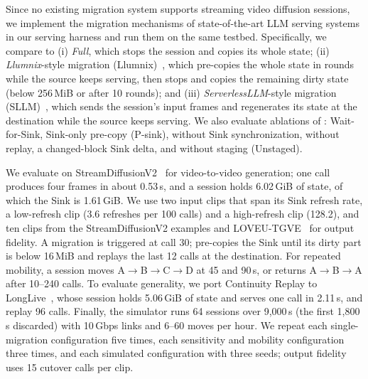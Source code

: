  Since no existing migration system supports streaming video diffusion
sessions, we implement the migration mechanisms of state-of-the-art LLM serving systems in our serving harness and run
them on the same testbed. Specifically, we compare \sys to (i) \emph{Full}, which stops the session and copies its
whole state; (ii) \emph{Llumnix}-style migration (Llumnix)~\cite{llumnix}, which pre-copies the whole state in rounds while the
source keeps serving, then stops and copies the remaining dirty state (below 256\,MiB or after 10 rounds); and
(iii) \emph{ServerlessLLM}-style migration (SLLM)~\cite{serverlessllm}, which sends the session's input frames and
regenerates its state at the destination while the source keeps serving. We also evaluate ablations of \sys:
Wait-for-Sink, Sink-only pre-copy (P-sink), \sys without Sink synchronization, \sys without replay, a changed-block
Sink delta, and \sys without staging (Unstaged).

 We evaluate \sys on StreamDiffusionV2~\cite{sdv2} for video-to-video
generation; one call produces four frames in about 0.53\,s, and a session holds 6.02\,GiB of state, of which the Sink
is 1.61\,GiB. We use two input clips that span its Sink refresh rate, a low-refresh clip (3.6 refreshes per 100 calls)
and a high-refresh clip (128.2), and ten clips from the StreamDiffusionV2 examples and LOVEU-TGVE~\cite{loveu} for
output fidelity. A migration is triggered at call 30; \sys pre-copies the Sink until its dirty part is below
16\,MiB and replays the last 12 calls at the destination. For repeated mobility, a session moves
A$\rightarrow$B$\rightarrow$C$\rightarrow$D at 45 and 90\,s, or returns A$\rightarrow$B$\rightarrow$A after 10--240
calls. To evaluate generality, we port Continuity Replay to LongLive~\cite{longlive}, whose session holds 5.06\,GiB of
state and serves one call in 2.11\,s, and replay 96 calls. Finally, the simulator runs 64 sessions over 9,000\,s
(the first 1,800\,s discarded) with 10\,Gbps links and 6--60 moves per hour. We repeat each single-migration
configuration five times, each sensitivity and mobility configuration three times, and each simulated configuration
with three seeds; output fidelity uses 15 cutover calls per clip.

